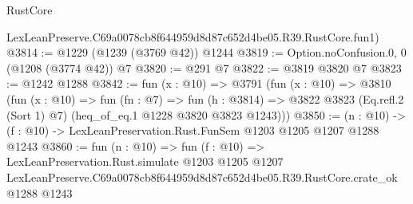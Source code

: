 \begin{lexlean}{RustCore}
\begin{coremodule}
    LexLeanPreserve.C69a0078cb8f644959d8d87c652d4be05.R39.RustCore.fun1)
@3814 := @1229 (@1239 (@3769 @42)) @1244
@3819 := Option.noConfusion.{0, 0} (@1208 (@3774 @42)) @7
@3820 := @291 @7
@3822 := @3819 @3820 @7
@3823 := @1242 @1288
@3842 := fun (x : @10) =>
  @3791
    (fun (x : @10) =>
    @3810
      (fun (x : @10) =>
      fun (fn : @7) =>
      fun (h : @3814) =>
      @3822 @3823 (Eq.refl.{2} (Sort 1) @7) (heq_of_eq.{1} @1228 @3820 @3823 @1243)))
@3850 := (n : @10) -> (f : @10) -> LexLeanPreservation.Rust.FunSem @1203 @1205 @1207 @1288 @1243
@3860 := fun (n : @10) =>
  fun (f : @10) =>
  LexLeanPreservation.Rust.simulate
    @1203
    @1205
    @1207
    LexLeanPreserve.C69a0078cb8f644959d8d87c652d4be05.R39.RustCore.crate_ok
    @1288
    @1243
\end{coremodule}
\end{lexlean}
